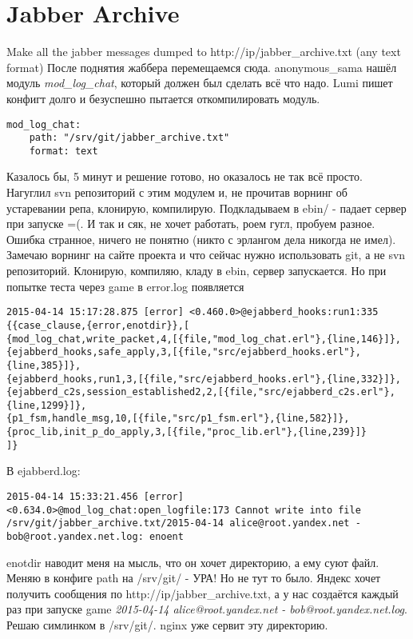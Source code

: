 \documentclass[a4paper,10pt]{report}
\begin{document}
\chapter{Jabber Archive}
Make all the jabber messages dumped to http://ip/jabber\_archive.txt (any text format)
\newline\newline
После поднятия жаббера перемещаемся сюда. anonymous\_sama нашёл модуль \textit{mod\_log\_chat}, который должен был сделать всё что надо.
\newline
Lumi пишет конфигт долго и безуспешно пытается откомпилировать модуль.
\begin{verbatim}
mod_log_chat:
    path: "/srv/git/jabber_archive.txt"
    format: text
\end{verbatim}
Казалось бы, 5 минут и решение готово, но оказалось не так всё просто. Нагуглил svn репозиторий с этим модулем и, не прочитав
ворнинг об устаревании репа, клонирую, компилирую. Подкладываем в ebin/ - падает сервер при запуске =(. И так и сяк, не хочет работать,
роем гугл, пробуем разное. Ошибка странное, ничего не понятно (никто с эрлангом дела никогда не имел).
Замечаю ворнинг на сайте проекта и что сейчас нужно использовать git, а не svn репозиторий. Клонирую, компиляю, кладу в ebin,
сервер запускается. Но при попытке теста через game в error.log появляется
\begin{verbatim}
2015-04-14 15:17:28.875 [error] <0.460.0>@ejabberd_hooks:run1:335 {{case_clause,{error,enotdir}},[
{mod_log_chat,write_packet,4,[{file,"mod_log_chat.erl"},{line,146}]},
{ejabberd_hooks,safe_apply,3,[{file,"src/ejabberd_hooks.erl"},{line,385}]},
{ejabberd_hooks,run1,3,[{file,"src/ejabberd_hooks.erl"},{line,332}]},
{ejabberd_c2s,session_established2,2,[{file,"src/ejabberd_c2s.erl"},{line,1299}]},
{p1_fsm,handle_msg,10,[{file,"src/p1_fsm.erl"},{line,582}]},
{proc_lib,init_p_do_apply,3,[{file,"proc_lib.erl"},{line,239}]}
]}
\end{verbatim}
В ejabberd.log:
\begin{verbatim}
2015-04-14 15:33:21.456 [error] <0.634.0>@mod_log_chat:open_logfile:173 Cannot write into file
/srv/git/jabber_archive.txt/2015-04-14 alice@root.yandex.net - bob@root.yandex.net.log: enoent
\end{verbatim}
enotdir наводит меня на мысль, что он хочет директорию, а ему суют файл. Меняю в конфиге path на /srv/git/ - УРА! Но не тут то было.
Яндекс хочет получить сообщения по http://ip/jabber\_archive.txt, а у нас создаётся каждый раз при запуске game
\textit{2015-04-14 alice@root.yandex.net - bob@root.yandex.net.log}. Решаю симлинком в /srv/git/. nginx уже сервит эту директорию.
\end{document}
